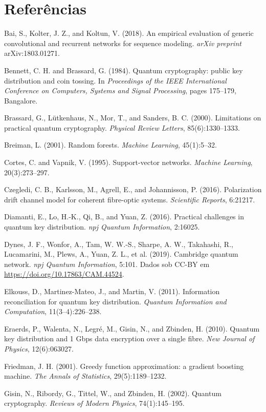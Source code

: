 \documentclass[12pt]{article}
\makeatletter
\renewenvironment{thebibliography}[1]{%
  \section*{Refer\^encias}%
  \list{}{\usecounter{enumiv}\let\p@enumiv\@empty%
    \renewcommand\theenumiv{\@arabic\c@enumiv}%
    \setlength{\labelwidth}{0pt}\setlength{\labelsep}{0pt}%
    \setlength{\leftmargin}{1.6em}\setlength{\itemindent}{-1.6em}%
    \setlength{\itemsep}{0.35em}\setlength{\parsep}{0pt}}%
  \small\sloppy\clubpenalty4000\widowpenalty4000%
  \let\@noitemerr\relax}%
 {\endlist}
\makeatother
\begin{document}
\begin{thebibliography}{99}
\small

\bibitem{} Bai, S., Kolter, J. Z., and Koltun, V. (2018). An empirical evaluation
of generic convolutional and recurrent networks for sequence modeling.
\textit{arXiv preprint} arXiv:1803.01271.

\bibitem{} Bennett, C. H. and Brassard, G. (1984). Quantum cryptography: public
key distribution and coin tossing. In \textit{Proceedings of the IEEE
International Conference on Computers, Systems and Signal Processing}, pages
175--179, Bangalore.

\bibitem{} Brassard, G., Lütkenhaus, N., Mor, T., and Sanders, B. C. (2000).
Limitations on practical quantum cryptography. \textit{Physical Review Letters},
85(6):1330--1333.

\bibitem{} Breiman, L. (2001). Random forests. \textit{Machine Learning},
45(1):5--32.

\bibitem{} Cortes, C. and Vapnik, V. (1995). Support-vector networks.
\textit{Machine Learning}, 20(3):273--297.

\bibitem{} Czegledi, C. B., Karlsson, M., Agrell, E., and Johannisson, P. (2016).
Polarization drift channel model for coherent fibre-optic systems.
\textit{Scientific Reports}, 6:21217.

\bibitem{} Diamanti, E., Lo, H.-K., Qi, B., and Yuan, Z. (2016). Practical
challenges in quantum key distribution. \textit{npj Quantum Information}, 2:16025.

\bibitem{} Dynes, J. F., Wonfor, A., Tam, W. W.-S., Sharpe, A. W., Takahashi, R.,
Lucamarini, M., Plews, A., Yuan, Z. L., et al. (2019). Cambridge quantum network.
\textit{npj Quantum Information}, 5:101. Dados sob CC-BY em
\url{https://doi.org/10.17863/CAM.44524}.

\bibitem{} Elkouss, D., Martinez-Mateo, J., and Martin, V. (2011). Information
reconciliation for quantum key distribution. \textit{Quantum Information and
Computation}, 11(3--4):226--238.

\bibitem{} Eraerds, P., Walenta, N., Legré, M., Gisin, N., and Zbinden, H. (2010).
Quantum key distribution and 1 Gbps data encryption over a single fibre.
\textit{New Journal of Physics}, 12(6):063027.

\bibitem{} Friedman, J. H. (2001). Greedy function approximation: a gradient
boosting machine. \textit{The Annals of Statistics}, 29(5):1189--1232.

\bibitem{} Gisin, N., Ribordy, G., Tittel, W., and Zbinden, H. (2002). Quantum
cryptography. \textit{Reviews of Modern Physics}, 74(1):145--195.


\end{thebibliography}
\end{document}
